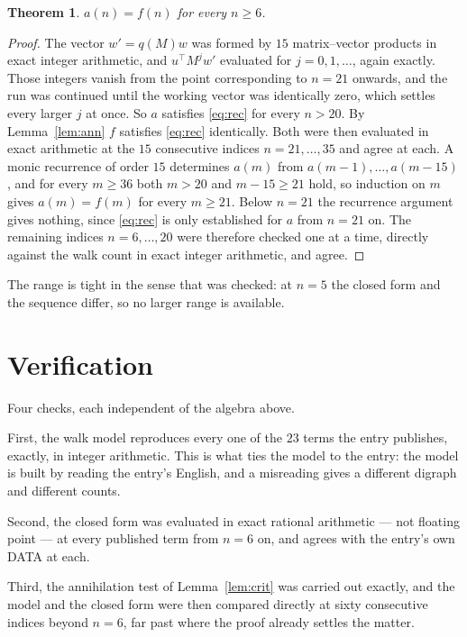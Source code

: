 \documentclass[11pt,a4paper]{article}
\theoremstyle{plain}
\newtheorem{theorem}{Theorem}
\theoremstyle{definition}
\begin{document}
\begin{theorem}
$a(n)=f(n)$ for every $n\ge6$.
\end{theorem}

\begin{proof}
The vector $w'=q(M)w$ was formed by $15$ matrix--vector products in exact integer
arithmetic, and $u^{\!\top}M^{j}w'$ evaluated for $j=0,1,\dots$, again exactly. Those integers
vanish from the point corresponding to $n=21$ onwards, and the run was continued until the
working vector was identically zero, which settles every larger $j$ at once. So $a$ satisfies
\eqref{eq:rec} for every $n>20$. By Lemma~\ref{lem:ann} $f$ satisfies \eqref{eq:rec}
identically. Both were then evaluated in exact arithmetic at the $15$ consecutive indices
$n=21,\dots,35$ and agree at each. A monic recurrence of order $15$
determines $a(m)$ from $a(m-1),\dots,a(m-15)$, and for every $m\ge36$ both
$m>20$ and $m-15\ge21$ hold, so induction on $m$ gives $a(m)=f(m)$ for every
$m\ge21$.
Below $n=21$ the recurrence argument gives nothing, since \eqref{eq:rec} is only
established for $a$ from $n=21$ on. The remaining indices $n=6,\dots,20$ were
therefore checked one at a time, directly against the walk count in exact integer arithmetic,
and agree.
\end{proof}

The range is tight in the sense that was checked: at $n=5$ the closed form and the sequence differ, so no larger range is available.

\section{Verification}

Four checks, each independent of the algebra above.

First, the walk model reproduces every one of the $23$ terms the entry publishes,
exactly, in integer arithmetic. This is what ties the model to the entry: the model is built
by reading the entry's English, and a misreading gives a different digraph and different
counts.

Second, the closed form was evaluated in exact rational arithmetic --- not floating point ---
at every published term from $n=6$ on, and agrees with the entry's own DATA at each.

Third, the annihilation test of Lemma~\ref{lem:crit} was carried out exactly, and the model
and the closed form were then compared directly at sixty consecutive indices beyond
$n=6$, far past where the proof already settles the matter.
\end{document}
